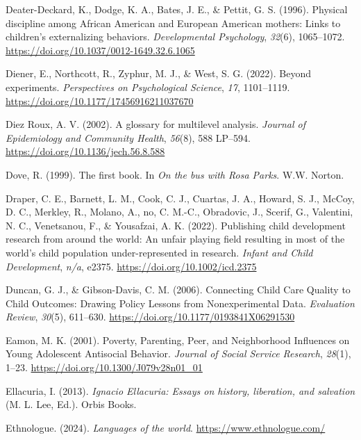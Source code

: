 \documentclass[
  letterpaper,
  DIV=11,
  numbers=noendperiod]{scrreprt}
\newlength{\cslhangindent}
\newenvironment{CSLReferences}[2] %
 {\begin{list}{}{%
  \setlength{\itemindent}{0pt}
  \setlength{\leftmargin}{0pt}
  \setlength{\parsep}{0pt}
  \ifodd #1
   \setlength{\leftmargin}{\cslhangindent}
   \setlength{\itemindent}{-1\cslhangindent}
  \fi
  \setlength{\itemsep}{#2\baselineskip}}}
 {\end{list}}
\begin{document}
\begin{CSLReferences}{1}{0}
Deater-Deckard, K., Dodge, K. A., Bates, J. E., \& Pettit, G. S. (1996).
{Physical discipline among African American and European American
mothers: Links to children's externalizing behaviors.}
\emph{Developmental Psychology}, \emph{32}(6), 1065--1072.
\url{https://doi.org/10.1037/0012-1649.32.6.1065}

Diener, E., Northcott, R., Zyphur, M. J., \& West, S. G. (2022). Beyond
experiments. \emph{Perspectives on Psychological Science}, \emph{17},
1101--1119. \url{https://doi.org/10.1177/17456916211037670}

Diez Roux, A. V. (2002). {A glossary for multilevel analysis}.
\emph{Journal of Epidemiology and Community Health}, \emph{56}(8), 588
LP--594. \url{https://doi.org/10.1136/jech.56.8.588}

Dove, R. (1999). The first book. In \emph{On the bus with {R}osa
{P}arks}. W.W. Norton.

Draper, C. E., Barnett, L. M., Cook, C. J., Cuartas, J. A., Howard, S.
J., McCoy, D. C., Merkley, R., Molano, A., no, C. M.-C., Obradovic, J.,
Scerif, G., Valentini, N. C., Venetsanou, F., \& Yousafzai, A. K.
(2022). Publishing child development research from around the world: An
unfair playing field resulting in most of the world's child population
under-represented in research. \emph{Infant and Child Development},
\emph{n/a}, e2375. \url{https://doi.org/10.1002/icd.2375}

Duncan, G. J., \& Gibson-Davis, C. M. (2006). {Connecting Child Care
Quality to Child Outcomes: Drawing Policy Lessons from Nonexperimental
Data}. \emph{Evaluation Review}, \emph{30}(5), 611--630.
\url{https://doi.org/10.1177/0193841X06291530}

Eamon, M. K. (2001). {Poverty, Parenting, Peer, and Neighborhood
Influences on Young Adolescent Antisocial Behavior}. \emph{Journal of
Social Service Research}, \emph{28}(1), 1--23.
\url{https://doi.org/10.1300/J079v28n01_01}

Ellacuria, I. (2013). \emph{{I}gnacio {E}llacuria: Essays on history,
liberation, and salvation} (M. L. Lee, Ed.). Orbis Books.

Ethnologue. (2024). \emph{Languages of the world}.
\url{https://www.ethnologue.com/}


\end{CSLReferences}
\end{document}
